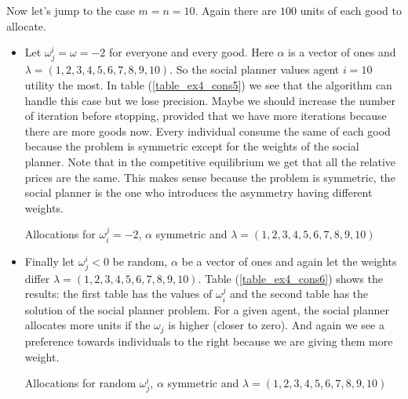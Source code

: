 \documentclass[a4paper,12pt]{article}
\begin{document}
    Now let's jump to the case $m=n=10$. Again there are $100$ units of each good to allocate. 
    
    \begin{itemize}
        \item Let $\omega_j^i = \omega = -2$ for everyone and every good. Here $\alpha$ is a vector of ones and $\lambda = (1,2,3,4,5,6,7,8,9,10)$. So the social planner values agent $i=10$ utility the most. In table (\ref{table_ex4_cons5}) we see that the algorithm can handle this case but we lose precision. Maybe we should increase the number of iteration before stopping, provided that we have more iterations because there are more goods now. Every individual consume the same of each good because the problem is symmetric except for the weights of the social planner. Note that in the competitive equilibrium we get that all the relative prices are the same. This makes sense because the problem is symmetric, the social planner is the one who introduces the asymmetry having different weights. 
        
        
        \begin{table}[!htbp]
            \centering
            \tiny 
            \caption[Short Caption for LoT]{Allocations for $\omega_i^j=-2$, $\alpha$ symmetric and $\lambda=(1,2,3,4,5,6,7,8,9,10)$}\label{table_ex4_cons5}
        \end{table}
        
        \item Finally let $\omega_j^i<0$ be random, $\alpha$ be a vector of ones and again let the weights differ $\lambda =(1,2,3,4,5,6,7,8,9,10)$. Table (\ref{table_ex4_cons6}) shows the results: the first table has the values of $\omega_i^j$ and the second table has the solution of the social planner problem. For a given agent, the social planner allocates more units if the $\omega_j$ is higher (closer to zero). And again we see a preference towards individuals to the right because we are giving them more weight. 
        
        \begin{table}[!htbp]
            \centering
            \tiny 
            \caption[Short Caption for LoT]{Allocations for random $\omega_j^i$, $\alpha$ symmetric and $\lambda=(1,2,3,4,5,6,7,8,9,10)$}\label{table_ex4_cons6}
            
            \vspace*{0.5 cm}
        \end{table}
    \end{itemize}
    
\end{document}
